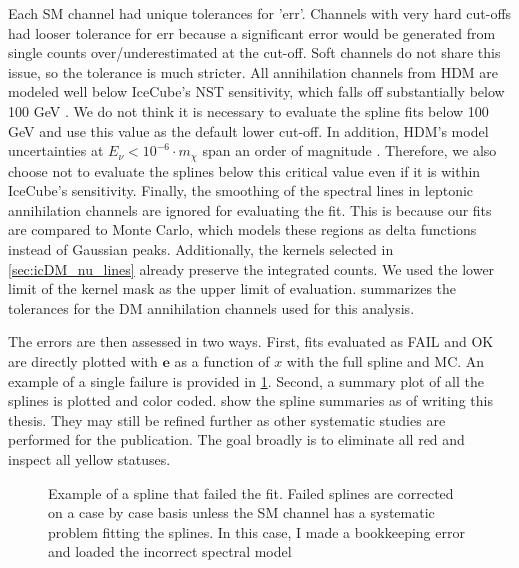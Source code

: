 Each SM channel had unique tolerances for 'err'.
Channels with very hard cut-offs had looser tolerance for err because a significant error would be generated from single counts over/underestimated at the cut-off.
Soft channels do not share this issue, so the tolerance is much stricter.
All annihilation channels from HDM are modeled well below IceCube's NST sensitivity, which falls off substantially below 100 GeV \cite{IC3_thesis_Cerver}.
We do not think it is necessary to evaluate the spline fits below 100 GeV and use this value as the default lower cut-off.
In addition, HDM's model uncertainties at $E_\nu < 10^{-6}\cdot m_\chi$ span an order of magnitude \cite{Rodd:HDM_spec}.
Therefore, we also choose not to evaluate the splines below this critical value even if it is within IceCube's sensitivity.
Finally, the smoothing of the spectral lines in leptonic annihilation channels are ignored for evaluating the fit.
This is because our fits are compared to Monte Carlo, which models these regions as delta functions instead of Gaussian peaks.
Additionally, the kernels selected in \cref{sec:icDM_nu_lines} already preserve the integrated counts.
We used the lower limit of the kernel mask as the upper limit of evaluation.
 summarizes the tolerances for the DM annihilation channels used for this analysis.


The errors are then assessed in two ways.
First, fits evaluated as FAIL and OK are directly plotted with $\textbf{e}$ as a function of $x$ with the full spline and MC.
An example of a single failure is provided in \cref{fig:icDM_failedspline}.
Second, a summary plot of all the splines is plotted and color coded.
 show the spline summaries as of writing this thesis.
They may still be refined further as other systematic studies are performed for the publication.
The goal broadly is to eliminate all red and inspect all yellow statuses.

\begin{figure}
    \caption{Example of a spline that failed the fit. Failed splines are corrected on a case by case basis unless the SM channel has a systematic problem fitting the splines. In this case, I made a bookkeeping error and loaded the incorrect spectral model}
    \label{fig:icDM_failedspline}
\end{figure}


